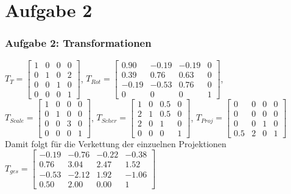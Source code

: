 \documentclass[accentcolor=tud9c,colorbacktitle,inverttitle,landscape,german,presentation,t]{tudbeamer}
\begin{document}
\section{Aufgabe 2}
\begin{frame}
	\frametitle{Aufgabe 2: Transformationen}
	$T_T=\begin{bmatrix}
	1 & 0 & 0 & 0\\
	0 & 1 & 0 & 2\\
	0 & 0 & 1 & 0\\
	0 & 0 & 0 & 1
	\end{bmatrix} $, 
	$T_{Rot}=\begin{bmatrix}
	0.90 & -0.19 & -0.19 & 0\\
	0.39 & 0.76 & 0.63 & 0\\
	-0.19 & -0.53 & 0.76 & 0\\
	0 & 0 & 0 & 1
	\end{bmatrix} $, 
	$T_{Scale}=\begin{bmatrix}
	1 & 0 & 0 & 0\\
	0 & 1 & 0 & 0\\
	0 & 0 & 3 & 0\\
	0 & 0 & 0 & 1
	\end{bmatrix} $, 
	$T_{Scher}=\begin{bmatrix}
	1 & 0 & 0.5 & 0\\
	2 & 1 & 0.5 & 0\\
	2 & 0 & 1 & 0\\
	0 & 0 & 0 & 1
	\end{bmatrix} $,
	 $T_{Proj}=\begin{bmatrix}
	 0 & 0 & 0 & 0\\
	 0 & 0 & 0 & 0\\
	 0 & 0 & 1 & 0\\
	 0.5 & 2 & 0 & 1
	 \end{bmatrix} $\\
	 
	 Damit folgt für die Verkettung der einzuelnen Projektionen\\
	 $T_{ges}=\begin{bmatrix}
	 -0.19 & -0.76 & -0.22 & -0.38\\
	  0.76 &  3.04 &  2.47 &  1.52\\
	 -0.53 & -2.12 &  1.92 & -1.06\\
	  0.50 &  2.00 &  0.00 &  1
	 \end{bmatrix} $
\end{frame}
\end{document}

